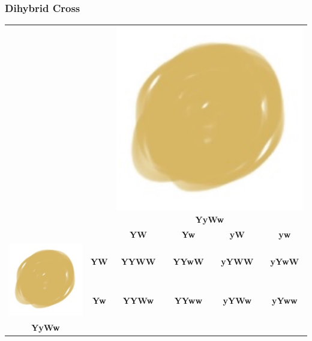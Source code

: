\documentclass{beamer}
\begin{document}
	\begin{frame}
		\frametitle{Dihybrid Cross}
	
		\begin{tabular}{c|c|c|c|c|c|}
			\multicolumn{2}{c|}{} & \multicolumn{4}{c}{	\includegraphics[width=0.1\linewidth]{img/yellowSmooth} \textcolor[HTML]{E1BE6A}{\textbf{YyWw}}} \\
			\cline{3-6} 
			\multicolumn{2}{c|}{} & \textcolor[HTML]{E1BE6A}{\textbf{YW}} &  \textcolor[HTML]{E1BE6A}{\textbf{Yw}}&  \textcolor[HTML]{E1BE6A}{\textbf{yW}} &  \textcolor[HTML]{E1BE6A}{\textbf{yw}}\\
			\hline 
			\multirow{2}{*}{\includegraphics[width=0.1\linewidth]{img/yellowSmooth} }	& \textcolor[HTML]{40B0A6}{\textbf{YW}}&
			\textcolor[HTML]{E1BE6A}{\textbf{Y}}\textcolor[HTML]{40B0A6}{\textbf{Y}}\textcolor[HTML]{E1BE6A}{\textbf{W}}\textcolor[HTML]{40B0A6}{\textbf{W}} &  
			\textcolor[HTML]{E1BE6A}{\textbf{Y}}\textcolor[HTML]{40B0A6}{\textbf{Y}}\textcolor[HTML]{E1BE6A}{\textbf{w}}\textcolor[HTML]{40B0A6}{\textbf{W}} 
			& \textcolor[HTML]{E1BE6A}{\textbf{y}}\textcolor[HTML]{40B0A6}{\textbf{Y}}\textcolor[HTML]{E1BE6A}{\textbf{W}}\textcolor[HTML]{40B0A6}{\textbf{W}} 
			&\textcolor[HTML]{E1BE6A}{\textbf{y}}\textcolor[HTML]{40B0A6}{\textbf{Y}}\textcolor[HTML]{E1BE6A}{\textbf{w}}\textcolor[HTML]{40B0A6}{\textbf{W}} \\		
			\cline{2-6} 
			
			&	\textcolor[HTML]{40B0A6}{\textbf{Yw}} & 
			\textcolor[HTML]{E1BE6A}{\textbf{Y}}\textcolor[HTML]{40B0A6}{\textbf{Y}}\textcolor[HTML]{E1BE6A}{\textbf{W}}\textcolor[HTML]{40B0A6}{\textbf{w}} &  
			\textcolor[HTML]{E1BE6A}{\textbf{Y}}\textcolor[HTML]{40B0A6}{\textbf{Y}}\textcolor[HTML]{E1BE6A}{\textbf{w}}\textcolor[HTML]{40B0A6}{\textbf{w}} 
			& \textcolor[HTML]{E1BE6A}{\textbf{y}}\textcolor[HTML]{40B0A6}{\textbf{Y}}\textcolor[HTML]{E1BE6A}{\textbf{W}}\textcolor[HTML]{40B0A6}{\textbf{w}} 
			&\textcolor[HTML]{E1BE6A}{\textbf{y}}\textcolor[HTML]{40B0A6}{\textbf{Y}}\textcolor[HTML]{E1BE6A}{\textbf{w}}\textcolor[HTML]{40B0A6}{\textbf{w}}\\
			\cline{2-6} 
			\multirow{2}{*}{\textcolor[HTML]{40B0A6}{\textbf{YyWw}}}&
			

\end{tabular}
\end{frame}
\end{document}
